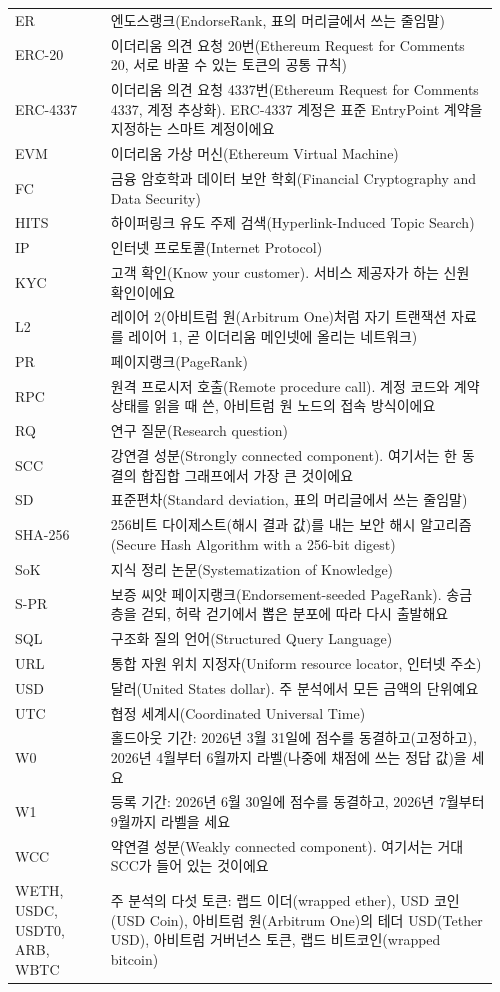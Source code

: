 \begin{longtable}{@{}>{\raggedright\arraybackslash}p{0.19\linewidth}p{0.77\linewidth}@{}}
ER & 엔도스랭크(EndorseRank, 표의 머리글에서 쓰는 줄임말) \\
ERC-20 & 이더리움 의견 요청 20번(Ethereum Request for Comments 20, 서로 바꿀 수 있는 토큰의 공통 규칙) \\
ERC-4337 & 이더리움 의견 요청 4337번(Ethereum Request for Comments 4337, 계정 추상화). ERC-4337 계정은 표준 EntryPoint 계약을 지정하는 스마트 계정이에요 \\
EVM & 이더리움 가상 머신(Ethereum Virtual Machine) \\
FC & 금융 암호학과 데이터 보안 학회(Financial Cryptography and Data Security) \\
HITS & 하이퍼링크 유도 주제 검색(Hyperlink-Induced Topic Search) \\
IP & 인터넷 프로토콜(Internet Protocol) \\
KYC & 고객 확인(Know your customer). 서비스 제공자가 하는 신원 확인이에요 \\
L2 & 레이어 2(아비트럼 원(Arbitrum One)처럼 자기 트랜잭션 자료를 레이어 1, 곧 이더리움 메인넷에 올리는 네트워크) \\
PR & 페이지랭크(PageRank) \\
RPC & 원격 프로시저 호출(Remote procedure call). 계정 코드와 계약 상태를 읽을 때 쓴, 아비트럼 원 노드의 접속 방식이에요 \\
RQ & 연구 질문(Research question) \\
SCC & 강연결 성분(Strongly connected component). 여기서는 한 동결의 합집합 그래프에서 가장 큰 것이에요 \\
SD & 표준편차(Standard deviation, 표의 머리글에서 쓰는 줄임말) \\
SHA-256 & 256비트 다이제스트(해시 결과 값)를 내는 보안 해시 알고리즘(Secure Hash Algorithm with a 256-bit digest) \\
SoK & 지식 정리 논문(Systematization of Knowledge) \\
\mbox{S-PR} & 보증 씨앗 페이지랭크(Endorsement-seeded PageRank). 송금 층을 걷되, 허락 걷기에서 뽑은 분포에 따라 다시 출발해요 \\
SQL & 구조화 질의 언어(Structured Query Language) \\
URL & 통합 자원 위치 지정자(Uniform resource locator, 인터넷 주소) \\
USD & 달러(United States dollar). 주 분석에서 모든 금액의 단위예요 \\
UTC & 협정 세계시(Coordinated Universal Time) \\
W0 & 홀드아웃 기간: 2026년 3월 31일에 점수를 동결하고(고정하고), 2026년 4월부터 6월까지 라벨(나중에 채점에 쓰는 정답 값)을 세요 \\
W1 & 등록 기간: 2026년 6월 30일에 점수를 동결하고, 2026년 7월부터 9월까지 라벨을 세요 \\
WCC & 약연결 성분(Weakly connected component). 여기서는 거대 SCC가 들어 있는 것이에요 \\
WETH, USDC, USDT0, ARB, WBTC & 주 분석의 다섯 토큰: 랩드 이더(wrapped ether), USD 코인(USD Coin), 아비트럼 원(Arbitrum One)의 테더 USD(Tether USD), 아비트럼 거버넌스 토큰, 랩드 비트코인(wrapped bitcoin) \\
\end{longtable}


